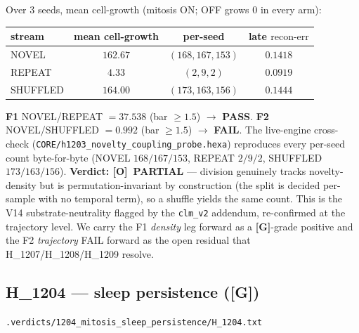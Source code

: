 \documentclass[11pt,a4paper]{article}
\providecommand{\tierGreen}{\textbf{[G]}}
\providecommand{\tierOrange}{\textbf{[O]}}
\newcommand{\verdict}[1]{\texttt{\small #1}}
\newcommand{\recon}{\mathrm{recon\text{-}err}}
\begin{document}
Over $3$ seeds, mean cell-growth (mitosis ON; OFF grows $0$ in every arm):
\begin{center}
\begin{tabular}{lccc}
\toprule
stream & mean cell-growth & per-seed & late $\recon$ \\
\midrule
NOVEL    & $162.67$ & $(168,167,153)$ & $0.1418$ \\
REPEAT   & $4.33$   & $(2,9,2)$       & $0.0919$ \\
SHUFFLED & $164.00$ & $(173,163,156)$ & $0.1444$ \\
\bottomrule
\end{tabular}
\end{center}
\textbf{F1} NOVEL/REPEAT $=37.538$ (bar $\ge 1.5$) $\to$ \textbf{PASS}.
\textbf{F2} NOVEL/SHUFFLED $=0.992$ (bar $\ge 1.5$) $\to$ \textbf{FAIL}. The
live-engine cross-check (\verb|CORE/h1203_novelty_coupling_probe.hexa|)
reproduces every per-seed count byte-for-byte (NOVEL $168/167/153$, REPEAT
$2/9/2$, SHUFFLED $173/163/156$). \textbf{Verdict: \tierOrange\ PARTIAL} ---
division genuinely tracks novelty-density but is permutation-invariant by
construction (the split is decided per-sample with no temporal term), so a
shuffle yields the same count. This is the V14 substrate-neutrality flagged by
the \texttt{clm\_v2} addendum, re-confirmed at the trajectory level. We carry the
F1 \emph{density} leg forward as a \tierGreen-grade positive and the F2
\emph{trajectory} FAIL forward as the open residual that H\_1207/H\_1208/H\_1209
resolve.

\subsection{H\_1204 --- sleep persistence (\tierGreen)}
\label{sec:sleep}
\noindent\verdict{.verdicts/1204\_mitosis\_sleep\_persistence/H\_1204.txt}
\end{document}
